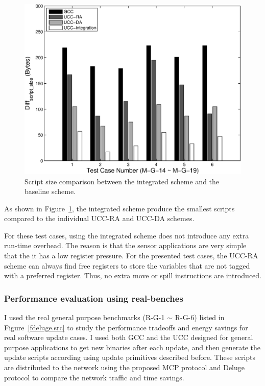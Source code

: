 \begin{figure}[htbp]
\centering
\includegraphics[scale=0.6]{./figures/inte-upd.eps}
\caption{Script size comparison between the integrated scheme and the baseline scheme.}
\label{general-inte}
\end{figure}

As shown in Figure~\ref{general-inte}, the integrated scheme produce the
smallest scripts compared to the individual UCC-RA and UCC-DA schemes. 

For these test cases, using the integrated scheme does not introduce any extra
run-time overhead. The reason is that the sensor applications are very simple that
the it has a low register pressure. For the presented test cases, the UCC-RA scheme can 
always find free registers to store the variables that are not tagged with a preferred
register. Thus, no extra move or spill instructions are introduced.


\subsubsection{Performance evaluation using real-benches}
I used the real general purpose benchmarks (R-G-1 $\sim$ R-G-6)
listed in Figure~\ref{fdeluge.src} to study the performance tradeoffs and
energy savings for real software update cases.
I used both GCC and the UCC designed for general purpose applications to get new binaries after each update, and then generate the update scripts according using 
update primitives described before. These scripts are distributed to the network using
the proposed MCP protocol and Deluge protocol to compare the network traffic and time savings.


